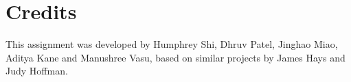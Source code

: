 \documentclass{article}
\begin{document}


\section*{Credits}
This assignment was developed by Humphrey Shi, Dhruv Patel, Jinghao Miao, Aditya Kane and Manushree Vasu, based on similar projects by James Hays and Judy Hoffman.
\end{document}
